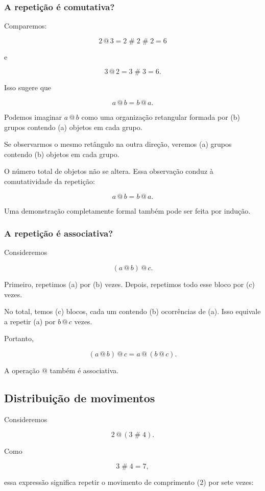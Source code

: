 \documentclass[12pt,a4paper]{article}
\makeatletter
\newcommand{\mov}{\mathbin{\#}}
\newcommand{\rep}{\mathbin{@}}
\makeatother
\begin{document}
\subsubsection{A repetição é comutativa?}

Comparemos:

\[
2\rep3=2\mov2\mov2=6
\]

e

\[
3\rep2=3\mov3=6.
\]

Isso sugere que

\[
a\rep b=b\rep a.
\]

Podemos imaginar $a\rep b$ como uma organização retangular formada
por (b) grupos contendo (a) objetos em cada grupo.

Se observarmos o mesmo retângulo na outra direção, veremos (a) grupos
contendo (b) objetos em cada grupo.

O número total de objetos não se altera. Essa observação conduz à
comutatividade da repetição:

\[
a\rep b=b\rep a.
\]

Uma demonstração completamente formal também pode ser feita por
indução.

\subsubsection{A repetição é associativa?}

Consideremos

\[
(a\rep b)\rep c.
\]

Primeiro, repetimos (a) por (b) vezes. Depois, repetimos todo esse
bloco por (c) vezes.

No total, temos (c) blocos, cada um contendo (b) ocorrências de
(a). Isso equivale a repetir (a) por $b\rep c$ vezes.

Portanto,

\[
(a\rep b)\rep c=a\rep(b\rep c).
\]

A operação $\rep$ também é associativa.

\subsection{Distribuição de movimentos}

Consideremos

\[
2\rep(3\mov4).
\]

Como

\[
3\mov4=7,
\]

essa expressão significa repetir o movimento de comprimento (2) por
sete vezes:
\end{document}
